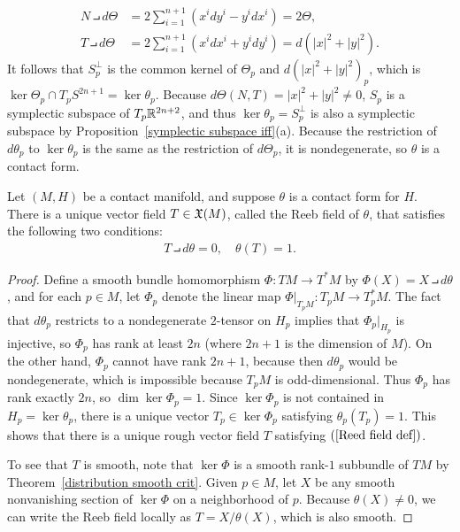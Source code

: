 \begin{example}
\begin{itemize}
\begin{align*}
N\intprod d\varTheta&=2\sum_{i=1}^{n+1}(x^idy^i-y^idx^i)=2\varTheta,\\
T\intprod d\varTheta&=2\sum_{i=1}^{n+1}(x^idx^i+y^idy^i)=d(|x|^2+|y|^2).
\end{align*}
It follows that $S^\bot_p$ is the common kernel of $\varTheta_p$ and $d(|x|^2+|y|^2)_p$, which is $\ker\varTheta_p\cap T_pS^{2n+1}=\ker\theta_p$. Because $d\varTheta(N,T)=|x|^2+|y|^2\neq 0$, $S_p$ is a symplectic subspace of $T_p\mathbb{R}^{2n+2}$, and thus $\ker\theta_p=S^\bot_p$ is also a symplectic subspace by Proposition~\ref{symplectic subspace iff}(a). Because the restriction of $d\theta_p$ to $\ker\theta_p$ is the same as the restriction of $d\varTheta_p$, it is nondegenerate, so $\theta$ is a contact form.
\end{itemize}
\end{example}
\begin{theorem}
Let $(M,H)$ be a contact manifold, and suppose $\theta$ is a contact form for $H$. There is a unique vector field $T\in\mathfrak{X}(M)$, called the Reeb field of $\theta$, that satisfies the following two conditions:
\begin{align}\label{Reed field def}
T\intprod d\theta=0,\quad\theta(T)=1.
\end{align}
\end{theorem}
\begin{proof}
Define a smooth bundle homomorphism $\varPhi:TM\to T^*M$ by $\varPhi(X)=X\intprod d\theta$, and for each $p\in M$, let $\varPhi_p$ denote the linear map $\varPhi|_{T_pM}:T_pM\to T^*_pM$. The fact that $d\theta_p$ restricts to a nondegenerate $2$-tensor on $H_p$ implies that $\varPhi_p|_{H_p}$ is injective, so $\varPhi_p$ has rank at least $2n$ (where $2n+1$ is the dimension of $M$). On the other hand, $\varPhi_p$ cannot have rank $2n+1$, because then $d\theta_p$ would be nondegenerate, which is impossible because $T_pM$ is odd-dimensional. Thus $\varPhi_p$ has rank exactly $2n$, so $\dim\ker\varPhi_p=1$. Since $\ker\varPhi_p$ is not contained in $H_p=\ker\theta_p$, there is a unique vector $T_p\in\ker\varPhi_p$ satisfying $\theta_p(T_p)=1$. This shows that there is a unique rough vector field $T$ satisfying $(\ref{Reed field def})$.\par
To see that $T$ is smooth, note that $\ker\varPhi$ is a smooth rank-$1$ subbundle of $TM$ by Theorem~\ref{distribution smooth crit}. Given $p\in M$, let $X$ be any smooth nonvanishing section of $\ker\varPhi$ on a neighborhood of $p$. Because $\theta(X)\neq 0$, we can write the Reeb field locally as $T=X/\theta(X)$, which is also smooth.
\end{proof}
